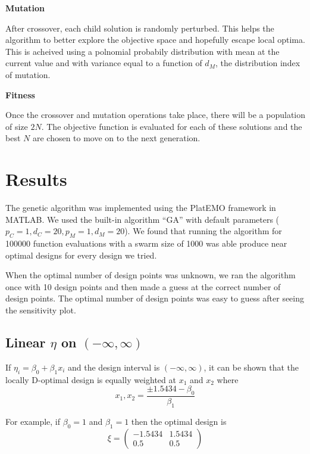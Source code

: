 \documentclass[11pt,a4paper]{article}
\begin{document}
\begin{flushleft}
\textbf{Mutation}
\end{flushleft}
After crossover, each child solution is randomly perturbed. This helps the algorithm to better explore the objective space and hopefully escape local optima. This is acheived using a polnomial probabily distribution with mean at the current value and with variance equal to a function of $d_M$, the distribution index of mutation.



\begin{flushleft}
\textbf{Fitness}
\end{flushleft}
Once the crossover and mutation operations take place, there will be a population of size $2N$. The objective function is evaluated for each of these solutions and the best $N$ are chosen to move on to the next generation.



\section{Results}
The genetic algorithm was implemented using the PlatEMO framework in MATLAB. We used the built-in algorithm ``GA'' with default parameters ($p_C = 1, d_C = 20, p_M = 1, d_M = 20$). We found that running the algorithm for 100000 function evaluations with a swarm size of 1000 was able produce near optimal designs for every design we tried. 

When the optimal number of design points was unknown, we ran the algorithm once with 10 design points and then made a guess at the correct number of design points. The optimal number of design points was easy to guess after seeing the sensitivity plot.

\subsection{Linear $\eta$ on $(-\infty, \infty)$}
If $\eta_i = \beta_0 + \beta_1 x_i$ and the design interval is $(-\infty, \infty)$, it can be shown that the locally D-optimal design is equally weighted at $x_1$ and $x_2$ where
$$
x_1, x_2 = \frac{\pm 1.5434 - \beta_0}{\beta_1}
$$

For example, if $\beta_0 = 1$ and $\beta_1 = 1$ then the optimal design is
$$
\xi = \begin{pmatrix}
-1.5434 & 1.5434\\ 0.5 & 0.5
\end{pmatrix}
$$
\end{document}
